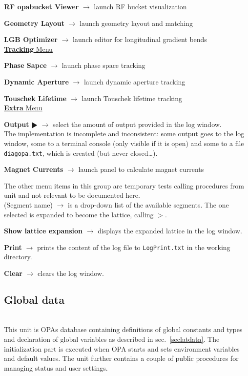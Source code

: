 \documentclass[12pt]{article}
\newcommand\code[1]{{\tt #1}}
\newcommand{\ofld}[1]{\colorbox{black!15}{{{\color{black}\bf #1}}}}
\newcommand{\ofldx}[1]{\colorbox{black!15}{{\color{black}(#1)}}}
\newcommand\guico[1]{{\color{blue}\code{#1}}}
\newcommand{\unico}[1]{{\color{burntorange}\code{#1}}}
\newcommand{\evcod}[2]{\ofld{#1} $\rightarrow$ \guico{#2}}
\newcommand{\evcodx}[2]{\ofldx{#1} $\rightarrow$ \guico{#2}}
\newcommand{\prcod}[2]{\opauni{#1}$>$\unico{#2}}
\newcommand{\opagui}[1]{\colorbox{blue!20}{{\color{black}\code{#1}}}}
\newcommand{\ogui}[1]{\hyperref[#1]{\opagui{#1}}}
\newcommand{\opauni}[1]{\colorbox{orange!30}{{\color{black}\code{#1}}}}
\newcommand{\ounih}[2]{\subsection{\label{#2}#1}{\Huge\opauni{#2}}\\}
\newcommand{\ouni}[1]{\hyperref[#1]{\opauni{#1}}}
\newcommand{\desc}[1]{#1}
\newcommand{\todo}[1]{{\color{red} #1}}
\begin{document}
{\evcod{RF opabucket Viewer}{ds\_rfbu} launch RF bucket visualization \ogui{opabucket}

\evcod{Geometry Layout}{ds\_geo } launch geometry layout and matching \ogui{opageometry}

\evcod{LGB Optimizer}{ds\_lgbo } launch editor for longitudinal gradient bends \ogui{opalgbedit}\\


\underline{\ofld{Tracking} Menu}

\evcod{Phase Sapce}{tr\_phsp} launch phase space tracking \ogui{opatrackps}

\evcod{Dynamic Aperture}{tr\_dyna} launch dynamic aperture tracking \ogui{opatrackda}

\evcod{Touschek Lifetime}{tr\_ttau} launch Touschek lifetime tracking \ogui{opatracktt}\\

\underline{\ofld{Extra} Menu}

\evcod{Output $\RHD$}{tm\_di} select the amount of output provided in the log window.\\ \todo{The implementation is incomplete and inconsistent: some output goes to the log window, some to a terminal console (only visible if it is open) and some to a file \code{diagopa.txt}, which is created (but never closed\dots).}

\evcod{Magnet Currents}{tm\_cur} launch panel to calculate magnet currents \ogui{opacurrents}

The other menu items in this group are temporary tests calling procedures from unit \ouni{testcode} and not relevant to be documented here.\\

\evcodx{Segment name}{ComboSeg} is a drop-down list of the available segments. The one selected is expanded to become the lattice, calling \prcod{editorlib}{MakeLattice}.

\evcod{Show lattice expansion}{butlatsh} displays the expanded lattice in the log window.

\evcod{Print}{ButLogPrt} prints the content of the log file to \code{LogPrint.txt} in the working directory.

\evcod{Clear}{ButLogClr} clears the log window.
}




\ounih{Global data}{globlib}

\desc{
This unit is OPAs database containing definitions of global constants and types and declaration of global variables as described in sec.~\ref{seclatdata}. 
The initialization part is executed when OPA starts and sets environment variables and default values. The unit further contains a couple of public procedures for managing status and user settings.
}
\end{document}
